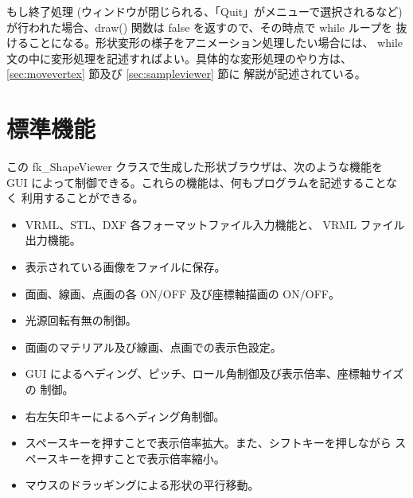 もし終了処理 (ウィンドウが閉じられる、「Quit」がメニューで選択されるなど)
が行われた場合、draw() 関数は false を返すので、その時点で while ループを
抜けることになる。形状変形の様子をアニメーション処理したい場合には、
while 文の中に変形処理を記述すればよい。具体的な変形処理のやり方は、
\ref{sec:movevertex} 節及び \ref{sec:sampleviewer} 節に
解説が記述されている。

\section{標準機能}
この fk\_ShapeViewer クラスで生成した形状ブラウザは、次のような機能を
GUI によって制御できる。これらの機能は、何もプログラムを記述することなく
利用することができる。

\begin{itemize}
 \item VRML、STL、DXF 各フォーマットファイル入力機能と、
	VRML ファイル出力機能。
 \item 表示されている画像をファイルに保存。
 \item 面画、線画、点画の各 ON/OFF 及び座標軸描画の ON/OFF。
 \item 光源回転有無の制御。
 \item 面画のマテリアル及び線画、点画での表示色設定。
 \item GUI によるヘディング、ピッチ、ロール角制御及び表示倍率、座標軸サイズの
	制御。
 \item 右左矢印キーによるヘディング角制御。
 \item スペースキーを押すことで表示倍率拡大。また、シフトキーを押しながら
	スペースキーを押すことで表示倍率縮小。
 \item マウスのドラッギングによる形状の平行移動。
\end{itemize}

